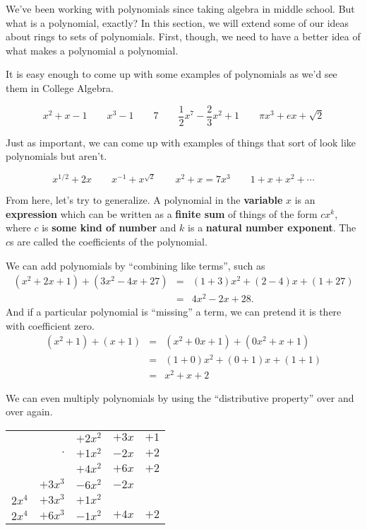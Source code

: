 \documentclass{article}
\begin{document}

We've been working with polynomials since taking algebra in middle school. But what is a polynomial, exactly? In this section, we will extend some of our ideas about rings to sets of polynomials. First, though, we need to have a better idea of what makes a polynomial a polynomial.

It is easy enough to come up with some examples of polynomials as we'd see them in College Algebra.

\[ x^2 + x - 1 \quad\quad x^3 - 1 \quad\quad 7 \quad\quad \frac{1}{2}x^7 - \frac{2}{3}x^2 + 1 \quad\quad \pi x^3 + e x + \sqrt{2} \]

Just as important, we can come up with examples of things that sort of look like polynomials but aren't.

\[ x^{1/2} + 2x \quad\quad x^{-1} + x^{\sqrt{2}} \quad\quad x^2 + x = 7x^3  \quad\quad 1 + x + x^2 + \cdots \]

From here, let's try to generalize. A polynomial in the \textbf{variable} $x$ is an \textbf{expression} which can be written as a \textbf{finite sum} of things of the form $cx^k$, where $c$ is \textbf{some kind of number} and $k$ is a \textbf{natural number exponent}. The $c$s are called the coefficients of the polynomial.

We can add polynomials by ``combining like terms'', such as
\begin{eqnarray*}
(x^2 + 2x + 1) + (3x^2 - 4x + 27) & = & (1+3)x^2 + (2 - 4)x + (1 + 27) \\
 & = & 4x^2 - 2x + 28.
\end{eqnarray*}
And if a particular polynomial is ``missing'' a term, we can pretend it is there with coefficient zero.
\begin{eqnarray*}
(x^2 + 1) + (x + 1) & = & (x^2 + 0x + 1) + (0x^2 + x + 1) \\
 & = & (1+0)x^2 + (0+1)x + (1+1) \\
 & = & x^2 + x + 2
\end{eqnarray*}

We can even multiply polynomials by using the ``distributive property'' over and over again.

\begin{center}
\begin{tabular}{rrrrr}
       &         & $+2x^2$ & $+3x$ & $+1$ \\
       & $\cdot$ & $+1x^2$ & $-2x$ & $+2$ \\ \hline
       &         & $+4x^2$ & $+6x$ & $+2$ \\
       & $+3x^3$ & $-6x^2$ & $-2x$ &      \\
$2x^4$ & $+3x^3$ & $+1x^2$ &       &      \\ \hline
$2x^4$ & $+6x^3$ & $-1x^2$ & $+4x$ & $+2$
\end{tabular}
\end{center}
\end{document}
